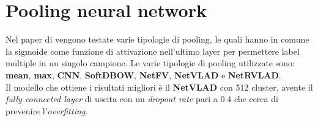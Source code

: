 \section{Pooling neural network}
Nel paper di \citet{soccerNet} vengono testate varie tipologie di pooling, le quali hanno in comune la sigmoide come funzione di attivazione nell'ultimo layer per permettere label multiple in un singolo campione.
Le varie tipologie di pooling utilizzate sono: \textbf{mean}, \textbf{max}, \textbf{CNN}, \textbf{SoftDBOW}, \textbf{NetFV}, \textbf{NetVLAD} e \textbf{NetRVLAD}. \cite{MiechPooling}
\\Il modello che ottiene i risultati migliori è il \textbf{NetVLAD} con 512 cluster, avente il \textit{fully connected layer} di uscita con un  \textit{dropout rate} pari a 0.4 che cerca di prevenire l'\textit{overfitting}.

